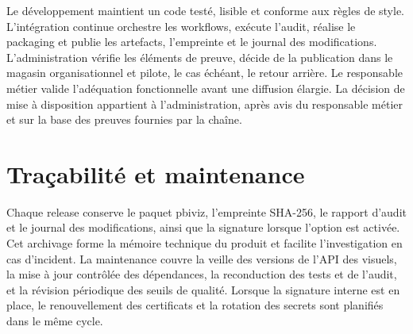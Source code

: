Le développement maintient un code testé, lisible et conforme aux règles de style. L’intégration continue orchestre les workflows, exécute l’audit, réalise le packaging et publie les artefacts, l’empreinte et le journal des modifications. L’administration vérifie les éléments de preuve, décide de la publication dans le magasin organisationnel et pilote, le cas échéant, le retour arrière. Le responsable métier valide l’adéquation fonctionnelle avant une diffusion élargie. La décision de mise à disposition appartient à l’administration, après avis du responsable métier et sur la base des preuves fournies par la chaîne.

\section{Traçabilité et maintenance}
\label{sec:maintenance-transfert}

Chaque release conserve le paquet pbiviz, l’empreinte SHA-256, le rapport d’audit et le journal des modifications, ainsi que la signature lorsque l’option est activée. Cet archivage forme la mémoire technique du produit et facilite l’investigation en cas d’incident. La maintenance couvre la veille des versions de l’API des visuels, la mise à jour contrôlée des dépendances, la reconduction des tests et de l’audit, et la révision périodique des seuils de qualité. Lorsque la signature interne est en place, le renouvellement des certificats et la rotation des secrets sont planifiés dans le même cycle.
